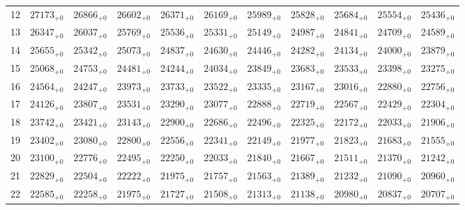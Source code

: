 \documentclass[10pt, a4paper]{article}
\begin{document}
\begin{center}
\begin{tabular}{c || c c c c c | c c c c c}
        12 & \({27173}_{+0}\) & \({26866}_{+0}\) & \({26602}_{+0}\) & \({26371}_{+0}\) & \({26169}_{+0}\) & \({25989}_{+0}\) & \({25828}_{+0}\) & \({25684}_{+0}\) & \({25554}_{+0}\) & \({25436}_{+0}\)\\
        13 & \({26347}_{+0}\) & \({26037}_{+0}\) & \({25769}_{+0}\) & \({25536}_{+0}\) & \({25331}_{+0}\) & \({25149}_{+0}\) & \({24987}_{+0}\) & \({24841}_{+0}\) & \({24709}_{+0}\) & \({24589}_{+0}\)\\
        14 & \({25655}_{+0}\) & \({25342}_{+0}\) & \({25073}_{+0}\) & \({24837}_{+0}\) & \({24630}_{+0}\) & \({24446}_{+0}\) & \({24282}_{+0}\) & \({24134}_{+0}\) & \({24000}_{+0}\) & \({23879}_{+0}\)\\
        15 & \({25068}_{+0}\) & \({24753}_{+0}\) & \({24481}_{+0}\) & \({24244}_{+0}\) & \({24034}_{+0}\) & \({23849}_{+0}\) & \({23683}_{+0}\) & \({23533}_{+0}\) & \({23398}_{+0}\) & \({23275}_{+0}\)\\
        \hline
        16 & \({24564}_{+0}\) & \({24247}_{+0}\) & \({23973}_{+0}\) & \({23733}_{+0}\) & \({23522}_{+0}\) & \({23335}_{+0}\) & \({23167}_{+0}\) & \({23016}_{+0}\) & \({22880}_{+0}\) & \({22756}_{+0}\)\\
        17 & \({24126}_{+0}\) & \({23807}_{+0}\) & \({23531}_{+0}\) & \({23290}_{+0}\) & \({23077}_{+0}\) & \({22888}_{+0}\) & \({22719}_{+0}\) & \({22567}_{+0}\) & \({22429}_{+0}\) & \({22304}_{+0}\)\\
        18 & \({23742}_{+0}\) & \({23421}_{+0}\) & \({23143}_{+0}\) & \({22900}_{+0}\) & \({22686}_{+0}\) & \({22496}_{+0}\) & \({22325}_{+0}\) & \({22172}_{+0}\) & \({22033}_{+0}\) & \({21906}_{+0}\)\\
        19 & \({23402}_{+0}\) & \({23080}_{+0}\) & \({22800}_{+0}\) & \({22556}_{+0}\) & \({22341}_{+0}\) & \({22149}_{+0}\) & \({21977}_{+0}\) & \({21823}_{+0}\) & \({21683}_{+0}\) & \({21555}_{+0}\)\\
        20 & \({23100}_{+0}\) & \({22776}_{+0}\) & \({22495}_{+0}\) & \({22250}_{+0}\) & \({22033}_{+0}\) & \({21840}_{+0}\) & \({21667}_{+0}\) & \({21511}_{+0}\) & \({21370}_{+0}\) & \({21242}_{+0}\)\\
        \hline
        21 & \({22829}_{+0}\) & \({22504}_{+0}\) & \({22222}_{+0}\) & \({21975}_{+0}\) & \({21757}_{+0}\) & \({21563}_{+0}\) & \({21389}_{+0}\) & \({21232}_{+0}\) & \({21090}_{+0}\) & \({20960}_{+0}\)\\
        22 & \({22585}_{+0}\) & \({22258}_{+0}\) & \({21975}_{+0}\) & \({21727}_{+0}\) & \({21508}_{+0}\) & \({21313}_{+0}\) & \({21138}_{+0}\) & \({20980}_{+0}\) & \({20837}_{+0}\) & \({20707}_{+0}\)\\

\end{tabular}
\end{center}
\end{document}
